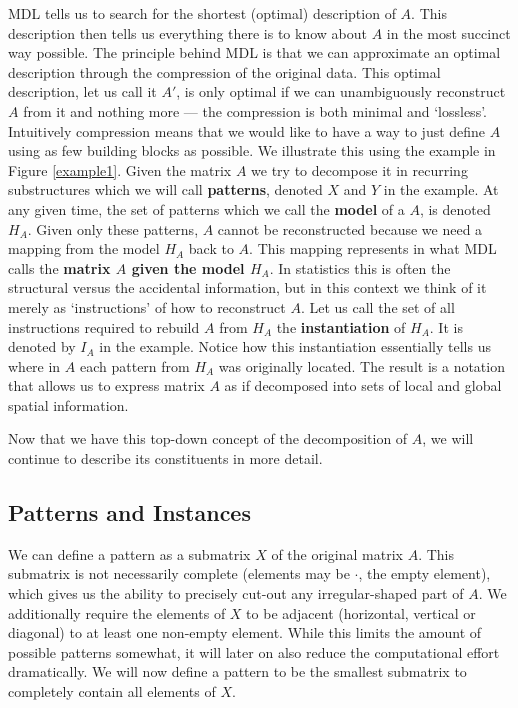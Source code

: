 \documentclass{llncs}
\begin{document}
MDL tells us to search for the shortest (optimal) description of $A$. This description then tells us everything there is to know about $A$ in the most succinct way possible. The principle behind MDL is that we can approximate an optimal description through the compression of the original data. This optimal description, let us call it $A'$, is only optimal if we can unambiguously reconstruct $A$ from it and nothing more --- the compression is both minimal and `lossless'. Intuitively compression means that we would like to have a way to just define $A$ using as few building blocks as possible. We illustrate this using the example in Figure \ref{example1}. Given the matrix $A$ we try to decompose it in recurring substructures which we will call \textbf{patterns}, denoted $X$ and $Y$ in the example. At any given time, the set of patterns which we call the \textbf{model} of a $A$, is denoted $H_A$. Given only these patterns, $A$ cannot be reconstructed because we need a mapping from the model $H_A$ back to $A$. This mapping represents in what MDL calls the \textbf{matrix $A$ given the model $H_A$}. In statistics this is often the structural versus the accidental information, but in this context we think of it merely as `instructions' of how to reconstruct $A$. Let us call the set of all instructions required to rebuild $A$ from $H_A$ the \textbf{instantiation} of $H_A$. It is denoted by ${I}_A$ in the example. Notice how this instantiation essentially tells us where in $A$ each pattern from $H_A$ was originally located.  The result is a notation that allows us to express matrix $A$ as if decomposed into sets of local and global spatial information.

Now that we have this top-down concept of the decomposition of $A$, we will continue to describe its constituents in more detail.



\subsection{Patterns and Instances}
We can define a pattern as a submatrix $X$ of the original matrix $A$. This submatrix is not necessarily complete (elements may be $\cdot$, the empty element), which gives us the ability to precisely cut-out any irregular-shaped part of $A$. We additionally require the elements of $X$ to be adjacent (horizontal, vertical or diagonal) to at least one non-empty element. While this limits the amount of possible patterns somewhat, it will later on also reduce the computational effort dramatically. We will now define a pattern to be the smallest submatrix to completely contain all elements of $X$.
\end{document}
